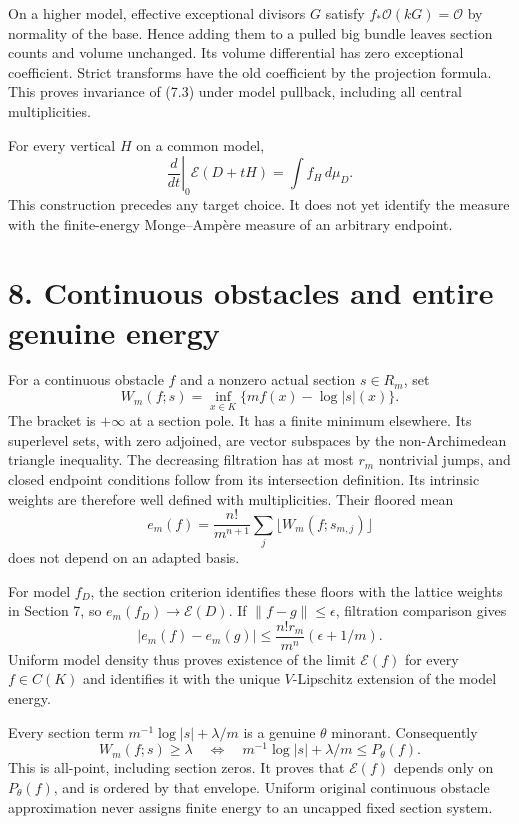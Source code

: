 \documentclass[
  10pt,
]{article}
\begin{document}
On a higher model, effective exceptional divisors \(G\) satisfy
\(f_*\mathcal O(kG)=\mathcal O\) by normality of the base. Hence adding
them to a pulled big bundle leaves section counts and volume unchanged.
Its volume differential has zero exceptional coefficient. Strict
transforms have the old coefficient by the projection formula. This
proves invariance of (7.3) under model pullback, including all central
multiplicities.

For every vertical \(H\) on a common model,
\[\left.\frac{d}{dt}\right|_{0}\mathscr E(D+tH)
=\int f_H\,d\mu_D.\tag{7.4}\] This construction precedes any target
choice. It does not yet identify the measure with the finite-energy
Monge--Ampère measure of an arbitrary endpoint.

\section{8. Continuous obstacles and entire genuine
energy}\label{continuous-obstacles-and-entire-genuine-energy}

For a continuous obstacle \(f\) and a nonzero actual section
\(s\in R_m\), set \[W_m(f;s)=\inf_{x\in K}\{mf(x)-\log|s|(x)\}.\] The
bracket is \(+\infty\) at a section pole. It has a finite minimum
elsewhere. Its superlevel sets, with zero adjoined, are vector subspaces
by the non-Archimedean triangle inequality. The decreasing filtration
has at most \(r_m\) nontrivial jumps, and closed endpoint conditions
follow from its intersection definition. Its intrinsic weights are
therefore well defined with multiplicities. Their floored mean
\[e_m(f)=\frac{n!}{m^{n+1}}\sum_j\lfloor W_m(f;s_{m,j})\rfloor\] does
not depend on an adapted basis.

For model \(f_D\), the section criterion identifies these floors with
the lattice weights in Section 7, so \(e_m(f_D)\to\mathscr E(D)\). If
\(\|f-g\|\leq\epsilon\), filtration comparison gives
\[|e_m(f)-e_m(g)|\leq \frac{n!r_m}{m^n}(\epsilon+1/m).\] Uniform model
density thus proves existence of the limit \(\mathscr E(f)\) for every
\(f\in C(K)\) and identifies it with the unique \(V\)-Lipschitz
extension of the model energy.

Every section term \(m^{-1}\log|s|+\lambda/m\) is a genuine \(\theta\)
minorant. Consequently \[W_m(f;s)\geq\lambda
\quad\Longleftrightarrow\quad
m^{-1}\log|s|+\lambda/m\leq P_\theta(f).\tag{8.1}\] This is all-point,
including section zeros. It proves that \(\mathscr E(f)\) depends only
on \(P_\theta(f)\), and is ordered by that envelope. Uniform original
continuous obstacle approximation never assigns finite energy to an
uncapped fixed section system.
\end{document}
